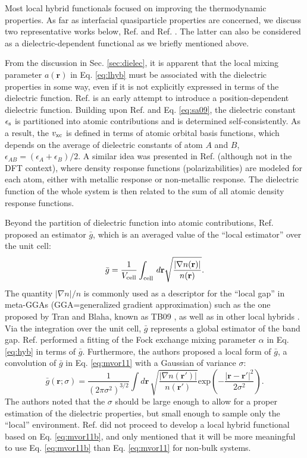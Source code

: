 \documentclass[aip, amsmath, amssymb, reprint, longbibliography]{revtex4-2}
\def\mr{\mathbf{r}}
\begin{document}
Most local hybrid functionals focused on improving the thermodynamic properties. As far as interfacial quasiparticle properties are concerned, we discuss two representative works below, Ref.  and Ref. . The latter can also be considered as a dielectric-dependent functional as we briefly mentioned above.

From the discussion in Sec. \ref{sec:dielec}, it is apparent that the local mixing parameter $a(\mr)$ in Eq. \eqref{eq:lhyb} must be associated with the dielectric properties in some way, even if it is not explicitly expressed in terms of the dielectric function. Ref.  is an early attempt to introduce a position-dependent dielectric function. Building upon Ref.  and Eq. \eqref{eq:sa09}, the dielectric constant $\epsilon_{\rm s}$ is partitioned into atomic contributions and is determined self-consistently. As a result, the $v_{\rm xc}$ is defined in terms of atomic orbital basis functions, which depends on the average of dielectric constants of atom $A$ and $B$, $\epsilon_{AB}=(\epsilon_A+\epsilon_B)/2$. A similar idea was presented in Ref.  (although not in the DFT context), where density response functions (polarizabilities) are modeled for each atom, either with metallic response or non-metallic response. The dielectric function of the whole system is then related to the sum of all atomic density response functions.

Beyond the partition of dielectric function into atomic contributions, Ref.  proposed an estimator $\bar{g}$, which is an averaged value of the ``local estimator'' over the unit cell:
\begin{equation}
\bar{g}=\frac{1}{V_{\rm cell}}\int_{\rm cell}\,d\mr \sqrt{\frac{|\nabla n(\mr)|}{n(\mr)}}.
\label{eq:mvor11}
\end{equation}
The quantity $|\nabla n|/n$ is commonly used as a descriptor for the ``local gap'' in meta-GGAs (GGA=generalized gradient approximation) such as the one proposed by Tran and Blaha, known as TB09 \cite{TB09}, as well as in other local hybrids \cite{KSPS08}. Via the integration over the unit cell, $\bar{g}$ represents a global estimator of the band gap. Ref.  performed a fitting of the Fock exchange mixing parameter $\alpha$ in Eq. \eqref{eq:hyb} in terms of $\bar{g}$. Furthermore, the authors proposed a local form of $\bar{g}$, a convolution of $\bar{g}$ in Eq. \eqref{eq:mvor11} with a Gaussian of variance $\sigma$:
\begin{equation}
\bar{g}(\mr;\sigma)=\frac{1}{(2\pi \sigma^2)^{3/2}}\int d\mr \, \sqrt{\frac{|\nabla n(\mr')|}{n(\mr')}}\mbox{exp}\left(-\frac{|\mr-\mr'|^2}{2\sigma^2}\right).
\label{eq:mvor11b}
\end{equation}
The authors noted that the $\sigma$ should be large enough to allow for a proper estimation of the dielectric properties, but small enough to sample only the ``local'' environment. Ref.  did not proceed to develop a local hybrid functional based on Eq. \eqref{eq:mvor11b}, and only mentioned that it will be more meaningful to use Eq. \eqref{eq:mvor11b} than Eq. \eqref{eq:mvor11} for non-bulk systems.
\end{document}
